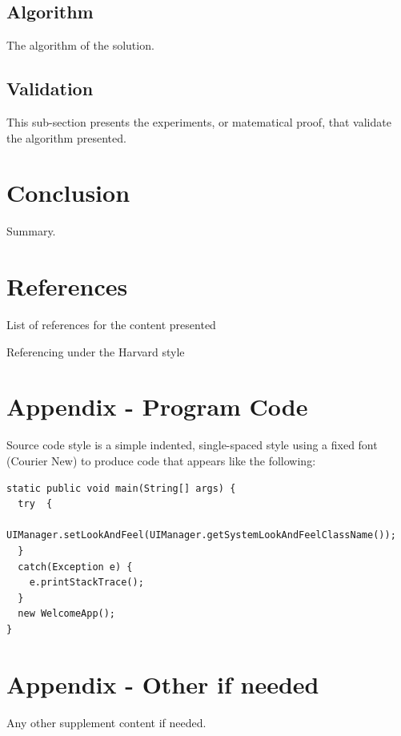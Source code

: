 \documentclass[letterpaper,arabicchapters,nochapterbreak]{fptthesis}
\begin{document}
\section{Algorithm}
The algorithm of the solution.
\clearpage
\section{Validation}
This sub-section presents the experiments, or matematical proof, that validate the algorithm presented.
\chapter{Conclusion}
Summary.
\chapter{References}
List of references for the content presented

Referencing under the Harvard style
\chapter{Appendix - Program Code}
Source code style is a simple indented, single-spaced style using a fixed font (Courier New) to produce code that appears like the following:
\begin{lstlisting}
static public void main(String[] args) {
  try  {
    UIManager.setLookAndFeel(UIManager.getSystemLookAndFeelClassName());
  }
  catch(Exception e) {
    e.printStackTrace();
  }
  new WelcomeApp();
}
\end{lstlisting}
\chapter{Appendix - Other if needed}
Any other supplement content if needed.
\end{document}
